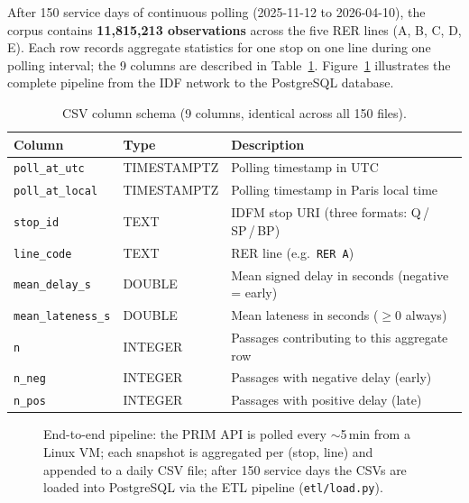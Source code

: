 \documentclass[a4paper,11pt]{article}
\begin{document}
After 150 service days of continuous polling (2025-11-12 to 2026-04-10),
the corpus contains \textbf{11,815,213 observations} across the five RER lines
(A, B, C, D, E).
Each row records aggregate statistics for one stop on one line during one polling
interval; the 9 columns are described in Table~\ref{tab:columns}.
Figure~\ref{fig:collection-pipeline} illustrates the complete pipeline from the
IDF network to the PostgreSQL database.

\begin{table}[H]
\centering
\small
\begin{tabular}{llp{7.0cm}}
\toprule
\textbf{Column} & \textbf{Type} & \textbf{Description} \\
\midrule
\texttt{poll\_at\_utc}    & TIMESTAMPTZ & Polling timestamp in UTC \\
\texttt{poll\_at\_local}  & TIMESTAMPTZ & Polling timestamp in Paris local time \\
\texttt{stop\_id}         & TEXT        & IDFM stop URI (three formats: Q\,/\,SP\,/\,BP) \\
\texttt{line\_code}       & TEXT        & RER line (e.g.\ \texttt{RER A}) \\
\texttt{mean\_delay\_s}   & DOUBLE      & Mean signed delay in seconds (negative = early) \\
\texttt{mean\_lateness\_s}& DOUBLE      & Mean lateness in seconds ($\geq 0$ always) \\
\texttt{n}                & INTEGER     & Passages contributing to this aggregate row \\
\texttt{n\_neg}           & INTEGER     & Passages with negative delay (early) \\
\texttt{n\_pos}           & INTEGER     & Passages with positive delay (late) \\
\bottomrule
\end{tabular}
\caption{CSV column schema (9 columns, identical across all 150 files).}
\label{tab:columns}
\end{table}

\begin{figure}[H]
  \centering
  
  \caption{End-to-end pipeline: the PRIM API is polled every ${\sim}$5\,min from a
    Linux VM; each snapshot is aggregated per (stop, line) and appended to a daily
    CSV file; after 150 service days the CSVs are loaded into PostgreSQL via the
    ETL pipeline (\texttt{etl/load.py}).}
  \label{fig:collection-pipeline}
\end{figure}
\end{document}

